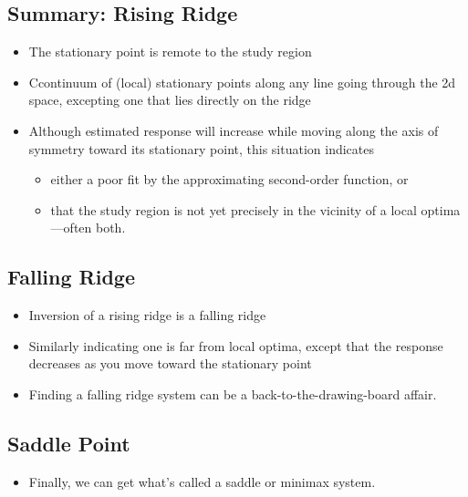 \documentclass[
  letterpaper,
  DIV=11,
  numbers=noendperiod]{scrreprt}
\providecommand{\tightlist}{%
  \setlength{\itemsep}{0pt}\setlength{\parskip}{0pt}}\usepackage{longtable,booktabs,array}
\begin{document}
\hypertarget{summary-rising-ridge}{%
\subsection{Summary: Rising Ridge}\label{summary-rising-ridge}}

\begin{itemize}
\tightlist
\item
  The stationary point is remote to the study region
\item
  Ccontinuum of (local) stationary points along any line going through
  the 2d space, excepting one that lies directly on the ridge
\item
  Although estimated response will increase while moving along the axis
  of symmetry toward its stationary point, this situation indicates

  \begin{itemize}
  \tightlist
  \item
    either a poor fit by the approximating second-order function, or
  \item
    that the study region is not yet precisely in the vicinity of a
    local optima---often both.
  \end{itemize}
\end{itemize}

\hypertarget{falling-ridge}{%
\subsection{Falling Ridge}\label{falling-ridge}}

\begin{itemize}
\tightlist
\item
  Inversion of a rising ridge is a falling ridge
\item
  Similarly indicating one is far from local optima, except that the
  response decreases as you move toward the stationary point
\item
  Finding a falling ridge system can be a back-to-the-drawing-board
  affair.
\end{itemize}

\hypertarget{saddle-point}{%
\subsection{Saddle Point}\label{saddle-point}}

\begin{itemize}
\tightlist
\item
  Finally, we can get what's called a saddle or minimax system.
\end{itemize}
\end{document}
